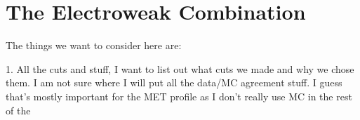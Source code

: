   \clearpage

\section{The Electroweak Combination}

The things we want to consider here are: 

  1. All the cuts and stuff, I want to list out what cuts we made and why we chose them. I am not sure where I will put all the data/MC agreement stuff. I guess that's mostly important for the MET profile as I don't really use MC in the rest of the
